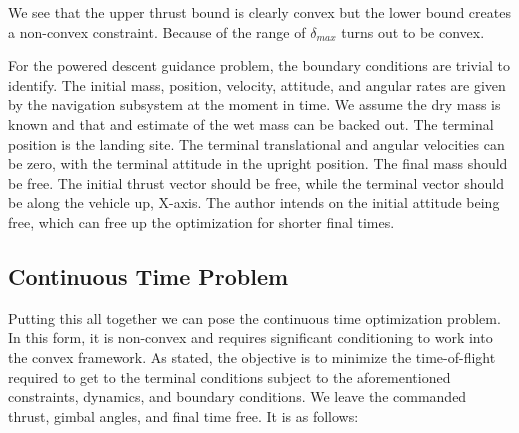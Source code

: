 We see that the upper thrust bound is clearly convex but the lower bound creates a non-convex constraint. Because of the range of  $\delta_{max}$ turns out to be convex.

For the powered descent guidance problem, the boundary conditions are trivial to identify. The initial mass, position, velocity, attitude, and angular rates are given by the navigation subsystem at the moment in time. We assume the dry mass is known and that and estimate of the wet mass can be backed out. The terminal position is the landing site. The terminal translational and angular velocities can be zero, with the terminal attitude in the upright position. The final mass should be free. The initial thrust vector should be free, while the terminal vector should be along the vehicle up, X-axis. The author intends on the initial attitude being free, which can free up the optimization for shorter final times.




\subsection{Continuous Time Problem}
Putting this all together we can pose the continuous time optimization problem. In this form, it is non-convex and requires significant conditioning to work into the convex framework. As stated, the objective is to minimize the time-of-flight required to get to the terminal conditions subject to the aforementioned constraints, dynamics, and boundary conditions. We leave the commanded thrust, gimbal angles, and final time free. It is as follows:
\clearpage

